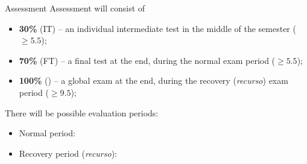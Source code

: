 \documentclass[aspectratio=169]{beamer}
\begin{document}
\begin{frame}{Assessment}
  Assessment will consist of
  \begin{itemize}
  \item \textbf{30\%} (\alert{IT}) -- an individual \alert{intermediate test} in the middle of the semester ($\geq 5.5$);
  \item \textbf{70\%} (\alert{FT}) -- a \alert{final test} at the end, during the normal exam period ($\geq 5.5$);
  \item \textbf{100\%} () -- a \alert{global exam} at the end, during the recovery (\emph{recurso}) exam period  ($\geq 9.5$);
  \end{itemize}

  There will be possible evaluation periods:
  \begin{itemize}
    \item Normal period:
    \item Recovery period (\emph{recurso}): 
  \end{itemize}
\end{frame}

\end{document}
